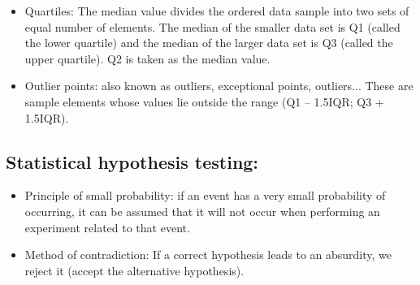 \documentclass{article}
\begin{document}
\begin{itemize}
\begin{itemize}
\begin{itemize}
				\item Quartiles: The median value divides the ordered data sample into two sets of equal number of elements. The median of the smaller data set is Q1 (called the lower quartile) and the median of the larger data set is Q3 (called the upper quartile). Q2 is taken as the median value.
				
				\item Outlier points: also known as outliers, exceptional points, outliers... These are sample elements whose values lie outside the range (Q1 – 1.5IQR; Q3 + 1.5IQR).
			\end{itemize}
		\end{itemize}
	\end{itemize}
	
	\subsection{Statistical hypothesis testing:}
	\begin{itemize}
		\item Principle of small probability: if an event has a very small probability of occurring, it can be assumed that it will not occur when performing an experiment related to that event.
		\item Method of contradiction: If a correct hypothesis leads to an absurdity, we reject it (accept the alternative hypothesis).
	\end{itemize}
	
\end{document}
